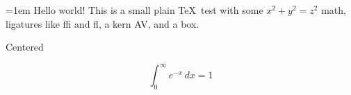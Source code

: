 \hsize=3in \parindent=1em
Hello world! This is a small plain \TeX\ test with some $x^2+y^2=z^2$ math,
ligatures like ffi and fl, a kern AV, and a \hbox{box}. \bigskip
\centerline{Centered} \vskip 1cm $$\int_0^\infty e^{-x}\,dx = 1$$
\showlists \bye
